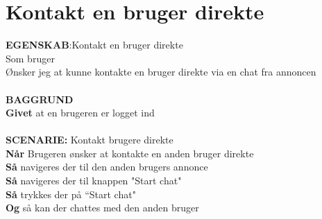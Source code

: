 \section{Kontakt en bruger direkte}
{\color{blue}\textbf{EGENSKAB}:}Kontakt en bruger direkte \\
Som bruger \\
Ønsker jeg at kunne kontakte en bruger direkte via en chat fra annoncen \\ \\
{\color{blue}\textbf{BAGGRUND}} \\
{\color{blue}\textbf{Givet}} at en brugeren er logget ind
 \\ \\
{\color{blue}\textbf{SCENARIE:}} Kontakt brugere direkte\\
{\color{blue}\textbf{Når}} Brugeren ønsker at kontakte en anden bruger direkte \\
{\color{blue}\textbf{Så}} navigeres der til den anden brugers annonce  \\
{\color{blue}\textbf{Så}} navigeres der til knappen "Start chat" \\
{\color{blue}\textbf{Så}} trykkes der på “Start chat" \\
{\color{blue}\textbf{Og}} så kan der chattes med den anden bruger \\ 